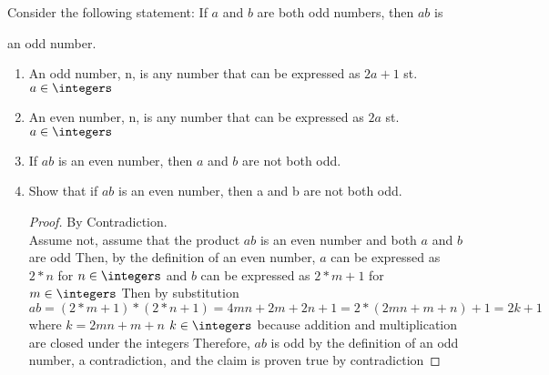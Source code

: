 \documentclass{article}
\begin{document}
\nextprob

Consider the following statement: If $a$ and $b$ are both odd numbers, then $ab$ is

an odd number.

\begin{enumerate}

    \item An odd number, n, is any number that can be expressed as $2a + 1$ st. $a \in \integers$

    \item An even number, n, is any number that can be expressed as $2a$ st. $a \in \integers$

    \item If $ab$ is an even number, then $a$ and $b$ are not both odd.

    \item Show that if $ab$ is an even number, then a and b are not both odd.

    	

    	\begin{proof} By Contradiction. \\

Assume not, assume that the product $ab$ is an even number and both $a$ and $b$ are odd
 Then, by the definition of an even number, $a$ can be expressed as $2*n$ for $n \in \integers$ and $b$ can be expressed as $2*m + 1$ for $m \in \integers$
 Then by substitution $ab = (2*m + 1) * (2*n + 1) = 4mn + 2m + 2n + 1 = 2 *(2mn + m + n) + 1 = 2k + 1$ where $k = 2mn + m + n$
 $k \in \integers$ because addition and multiplication are closed under the integers
Therefore, $ab$ is odd by the definition of an odd number, a contradiction, and the claim is proven true by contradiction
    	\end{proof}

    	

\end{enumerate}
\end{document}
